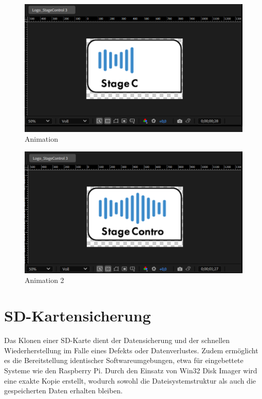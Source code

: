 \begin{figure}[H]
	\centering
	\includegraphics[width=0.7\linewidth]{images/Animation1.png}
	\caption[Animation]{Animation}
	\label{fig:Animation}
\end{figure} 

\begin{figure}[H]
	\centering
	\includegraphics[width=0.7\linewidth]{images/Animation2.png}
	\caption[Animation 2]{Animation 2}
	\label{fig:Animation-2}
\end{figure} 


\newpage
\section{SD-Kartensicherung}
Das Klonen einer SD-Karte dient der Datensicherung und der schnellen Wiederherstellung im Falle eines Defekts oder Datenverlustes. Zudem ermöglicht es die Bereitstellung identischer Softwareumgebungen, etwa für eingebettete Systeme wie den Raspberry Pi. Durch den Einsatz von Win32 Disk Imager wird eine exakte Kopie erstellt, wodurch sowohl die Dateisystemstruktur als auch die gespeicherten Daten erhalten bleiben.

